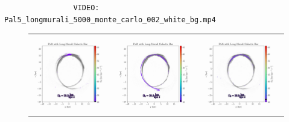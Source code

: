             \begin{verbatim}
                VIDEO: Pal5_longmurali_5000_monte_carlo_002_white_bg.mp4
            \end{verbatim}

            \begin{figure}
                \centering
                \begin{tabular}{ccc}
                    \includegraphics[width=.32\linewidth]{images/frame_0002.png}&
                    \includegraphics[width=.32\linewidth]{images/frame_0004.png}&
                    \includegraphics[width=.32\linewidth]{images/frame_0008.png}\\
                    

\end{tabular}
\end{figure}
